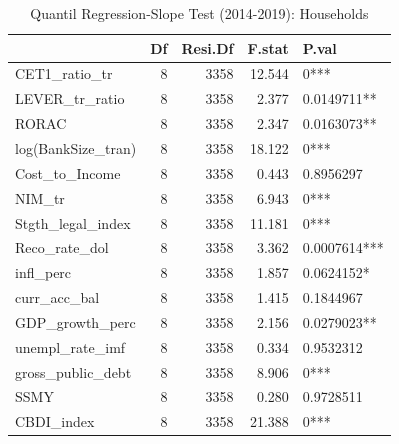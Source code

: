 \begin{table}[ht]
\centering
\caption{Quantil Regression-Slope Test (2014-2019): Households} 
\begingroup\small
\begin{tabular}{lrrrl}
  \toprule
 & Df & Resi.Df & F.stat & P.val \\ 
  \midrule
CET1\_ratio\_tr & 8 & 3358 & 12.544 & 0*** \\ 
  LEVER\_tr\_ratio & 8 & 3358 & 2.377 & 0.0149711** \\ 
  RORAC & 8 & 3358 & 2.347 & 0.0163073** \\ 
  log(BankSize\_tran) & 8 & 3358 & 18.122 & 0*** \\ 
  Cost\_to\_Income & 8 & 3358 & 0.443 & 0.8956297 \\ 
  NIM\_tr & 8 & 3358 & 6.943 & 0*** \\ 
  Stgth\_legal\_index & 8 & 3358 & 11.181 & 0*** \\ 
  Reco\_rate\_dol & 8 & 3358 & 3.362 & 0.0007614*** \\ 
  infl\_perc & 8 & 3358 & 1.857 & 0.0624152* \\ 
  curr\_acc\_bal & 8 & 3358 & 1.415 & 0.1844967 \\ 
  GDP\_growth\_perc & 8 & 3358 & 2.156 & 0.0279023** \\ 
  unempl\_rate\_imf & 8 & 3358 & 0.334 & 0.9532312 \\ 
  gross\_public\_debt & 8 & 3358 & 8.906 & 0*** \\ 
  SSMY & 8 & 3358 & 0.280 & 0.9728511 \\ 
  CBDI\_index & 8 & 3358 & 21.388 & 0*** \\ 
   \bottomrule
\end{tabular}
\endgroup
\end{table}
